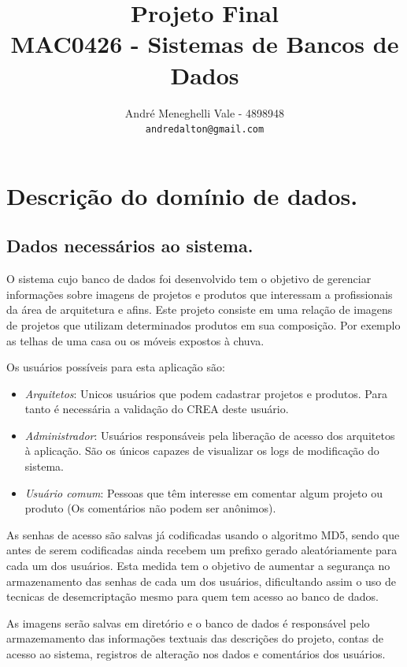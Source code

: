 \documentclass[12pt,a4paper]{article}
\title{Projeto Final\\MAC0426 - Sistemas de Bancos de Dados}
\author{
    André Meneghelli Vale - 4898948\\
    \texttt{andredalton@gmail.com}
}
\date{}
\begin{document}
\clearpage\maketitle
\thispagestyle{empty}



\newpage

\section{Descrição do domínio de dados.}

\subsection{Dados necessários ao sistema.}

O sistema cujo banco de dados foi desenvolvido tem o objetivo de gerenciar informações sobre imagens de projetos e produtos que interessam a profissionais da área de arquitetura e afins. Este projeto consiste em uma relação de imagens de projetos que utilizam determinados produtos em sua composição. Por exemplo as telhas de uma casa ou os móveis expostos à chuva.

Os usuários possíveis para esta aplicação são:

\begin{itemize}
\item \emph{Arquitetos}: Unicos usuários que podem cadastrar projetos e produtos. Para tanto é necessária a validação do CREA deste usuário.
\item \emph{Administrador}: Usuários responsáveis pela liberação de acesso dos arquitetos à aplicação. São os únicos capazes de visualizar os logs de modificação do sistema.
\item \emph{Usuário comum}: Pessoas que têm interesse em comentar algum projeto ou produto (Os comentários não podem ser anônimos).
\end{itemize}

As senhas de acesso são salvas já codificadas usando o algoritmo MD5, sendo que antes de serem codificadas ainda recebem um prefixo gerado aleatóriamente para cada um dos usuários. Esta medida tem o objetivo de aumentar a segurança no armazenamento das senhas de cada um dos usuários, dificultando assim o uso de tecnicas de desemcriptação mesmo para quem tem acesso ao banco de dados.

As imagens serão salvas em diretório e o banco de dados é responsável pelo armazemamento das informações textuais das descrições do projeto, contas de acesso ao sistema, registros de alteração nos dados e comentários dos usuários.
\end{document}
